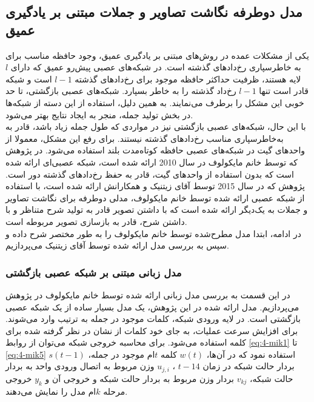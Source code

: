 \subsection{مدل دوطرفه نگاشت تصاویر و جملات مبتنی بر یادگیری عمیق}
یکی از مشکلات عمده در روش‌های مبتنی بر یادگیری عمیق، وجود حافظه مناسب برای به‌‌ خاطرسپاری رخ‌دادهای گذشته است. در شبکه‌های عصبی پیش‌رو عمیق که دارای $l$ لایه هستند، ظرفیت حداکثر حافظه موجود برای رخ‌دادهای گذشته $l-1$ است و شبکه قادر است تنها $l-1$ رخ‌داد گذشته را به‌ خاطر بسپارد. شبکه‌های عصبی بازگشتی، تا حد خوبی این مشکل را برطرف می‌نمایند. به همین دلیل، استفاده از این دسته از شبکه‌ها در بخش تولید جمله، منجر به ایجاد نتایج بهتر می‌شود. 
\\
با این حال، شبکه‌های عصبی بازگشتی نیز در مواردی که طول جمله زیاد باشد، قادر به به‌خاطرسپاری مناسب رخ‌دادهای گذشته نیستند. برای رفع این مشکل، معمولا از واحد‌های گیت در شبکه‌های عصبی حافظه کوتاه‌مدت بلند استفاده می‌شود. در پژوهش \cite{mikolov2010recurrent} که توسط خانم مایکولوف
 در سال 2010 ارائه شده است، شبکه عصبی‌ای ارائه شده است که بدون استفاده از واحدهای گیت، قادر به حفظ رخ‌دادهای گذشته دور است. پژوهش \cite{chen2015mind} که در سال 2015 توسط آقای زیتنیک و همکارانش ارائه شده است، با استفاده از شبکه عصبی ارائه شده توسط خانم مایکولوف، مدلی دوطرفه برای نگاشت تصاویر و جملات به یک‌دیگر ارائه شده است که با داشتن تصویر قادر به تولید شرح متناظر و با داشتن شرح، قادر به بازسازی تصویر مربوطه است.
\\
در ادامه، ابتدا مدل مطرح‌شده توسط خانم مایکولوف را به طور مختصر شرح داده و سپس به بررسی مدل ارائه شده توسط آقای زیتنیک می‌پردازیم.

\subsubsection{مدل زبانی مبتنی بر شبکه عصبی بازگشتی}
در این قسمت به بررسی مدل زبانی ارائه شده توسط خانم مایکولوف در پژوهش \cite{mikolov2010recurrent} می‌پردازیم. مدل ارائه شده در این پژوهش، یک مدل بسیار ساده از یک شبکه عصبی بازگشتی است. در لایه ورودی شبکه، کلمات موجود در جمله به ترتیب وارد می‌شوند. برای افزایش سرعت عملیات، به جای خود کلمات از نشان در نظر گرفته شده برای کلمه استفاده می‌شود. برای محاسبه خروجی شبکه می‌توان از روابط \eqref{eq:4-mik1} تا \eqref{eq:4-mik5} استفاده نمود که در آن‌ها، $w(t)$ کلمه $t$ام موجود در جمله، $s(t-1)$ بردار حالت شبکه در زمان 
$t-14$
، $u_{j,i}$
 وزن مربوط به اتصال ورودی واحد به بردار حالت شبکه، $v_{kj}$ بردار وزن مربوط به بردار حالت شبکه و خروجی آن و $y_k$ خروجی مرحله $k$ام مدل را نمایش می‌دهند.


